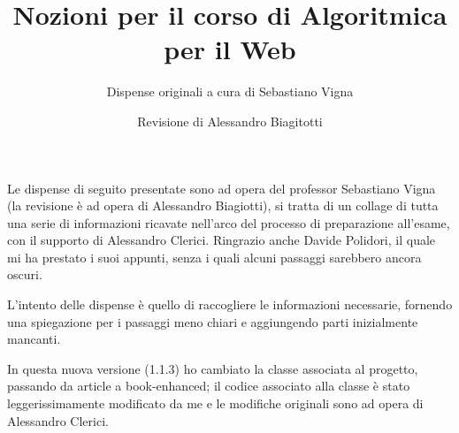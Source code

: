 \documentclass[a4paper]{book-enhanced}
\title{Nozioni per il corso di Algoritmica per il Web}
\subtitle{Dispense originali a cura di Sebastiano Vigna}
\author{Revisione di Alessandro Biagitotti}
\begin{document}
\maketitle
\noindent Le dispense di seguito presentate sono ad opera del professor Sebastiano Vigna (la
revisione è ad opera di Alessandro Biagiotti), si tratta di un collage di tutta una serie di
informazioni ricavate nell'arco del processo di preparazione all'esame, con il supporto di
Alessandro Clerici. Ringrazio anche Davide Polidori, il quale mi ha prestato i suoi appunti, senza i
quali alcuni passaggi sarebbero ancora oscuri.

L'intento delle dispense è quello di raccogliere le informazioni necessarie, fornendo una spiegazione per i passaggi meno chiari e aggiungendo parti inizialmente mancanti.

In questa nuova versione (1.1.3) ho cambiato la classe associata al progetto, passando da article a book-enhanced; il codice associato alla classe è stato leggerissimamente modificato da me e le modifiche originali sono ad opera di Alessandro Clerici.

\tableofcontents
\clearpage



\end{document}
